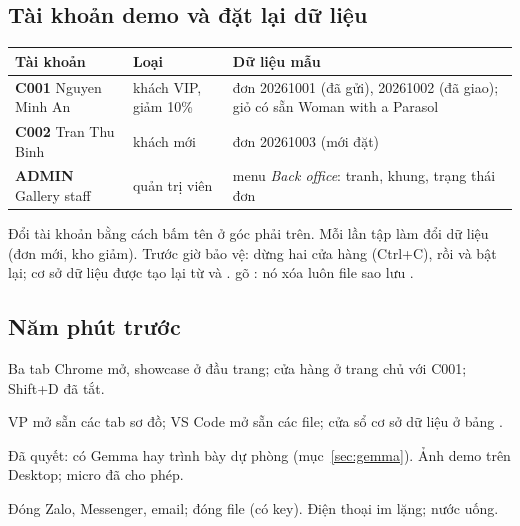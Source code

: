 \subsection{Tài khoản demo và đặt lại dữ liệu}\label{sec:reset}
\begin{center}\small
\begin{tabular}{@{}P{3.6cm}P{3.6cm}P{8.6cm}@{}}
\toprule
\textbf{Tài khoản} & \textbf{Loại} & \textbf{Dữ liệu mẫu}\\
\midrule
\textbf{C001} Nguyen Minh An & khách VIP, giảm 10\% & đơn 20261001 (đã gửi), 20261002 (đã giao); giỏ có sẵn Woman with a Parasol\\
\textbf{C002} Tran Thu Binh & khách mới & đơn 20261003 (mới đặt)\\
\textbf{ADMIN} Gallery staff & quản trị viên & menu \emph{Back office}: tranh, khung, trạng thái đơn\\
\bottomrule
\end{tabular}
\end{center}
Đổi tài khoản bằng cách bấm tên ở góc phải trên. Mỗi lần tập làm đổi dữ liệu (đơn mới, kho giảm). Trước giờ bảo vệ: dừng hai cửa hàng (Ctrl+C), rồi
và bật lại; cơ sở dữ liệu được tạo lại từ  và .  gõ : nó xóa luôn file sao lưu .

\subsection{Năm phút trước}
\begin{checklist}
\item Ba tab Chrome mở, showcase ở đầu trang; cửa hàng ở trang chủ với C001; Shift+D đã tắt.
\item VP mở sẵn các tab sơ đồ; VS Code mở sẵn các file; cửa sổ cơ sở dữ liệu ở bảng .
\item Đã quyết: có Gemma hay trình bày dự phòng (mục~\ref{sec:gemma}). Ảnh demo trên Desktop; micro đã cho phép.
\item Đóng Zalo, Messenger, email; đóng file  (có key). Điện thoại im lặng; nước uống.
\end{checklist}
